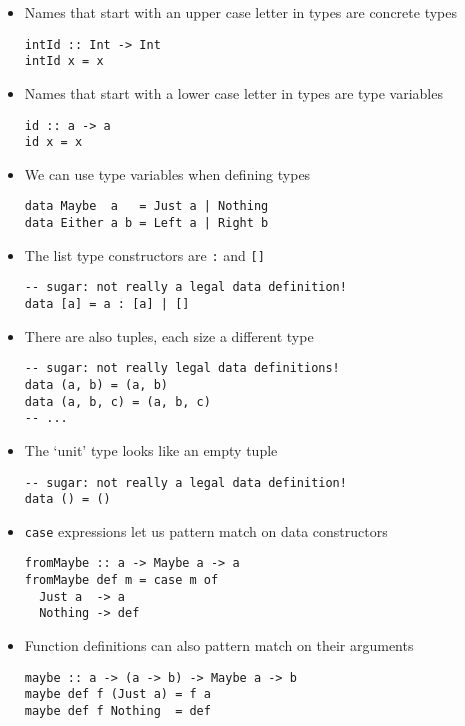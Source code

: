 \begin{itemize}
\item Names that start with an upper case letter in types are concrete
  types
\begin{verbatim}
intId :: Int -> Int
intId x = x
\end{verbatim}

\item Names that start with a lower case letter in types are type
  variables
\begin{verbatim}
id :: a -> a
id x = x
\end{verbatim}

\item We can use type variables when defining types
\begin{verbatim}
data Maybe  a   = Just a | Nothing
data Either a b = Left a | Right b
\end{verbatim}

\item The list type constructors are \verb|:| and \verb|[]|
\begin{verbatim}
-- sugar: not really a legal data definition!
data [a] = a : [a] | []
\end{verbatim}

\item There are also tuples, each size a different type
\begin{verbatim}
-- sugar: not really legal data definitions!
data (a, b) = (a, b)
data (a, b, c) = (a, b, c)
-- ...
\end{verbatim}

\item The `unit' type looks like an empty tuple
\begin{verbatim}
-- sugar: not really a legal data definition!
data () = ()
\end{verbatim}

\item \verb|case| expressions let us pattern match on data
  constructors
\begin{verbatim}
fromMaybe :: a -> Maybe a -> a
fromMaybe def m = case m of
  Just a  -> a
  Nothing -> def
\end{verbatim}

\item Function definitions can also pattern match on their arguments
\begin{verbatim}
maybe :: a -> (a -> b) -> Maybe a -> b
maybe def f (Just a) = f a
maybe def f Nothing  = def
\end{verbatim}


\end{itemize}
